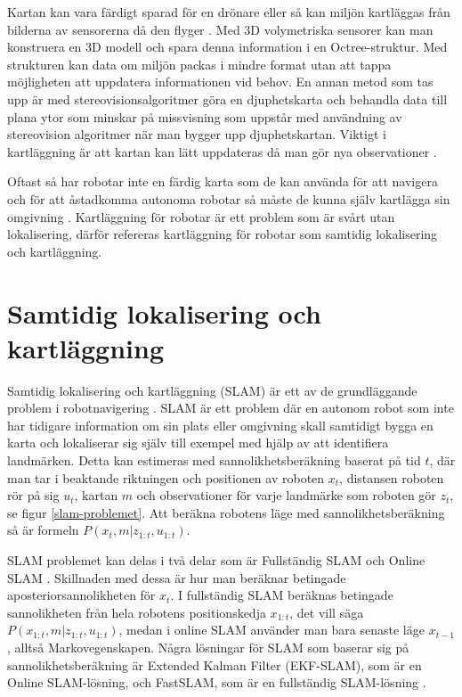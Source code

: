Kartan kan vara färdigt sparad för en drönare eller så kan miljön kartläggas från bilderna av sensorerna då den flyger \citep{geospatial}. Med 3D volymetriska sensorer kan man konstruera en 3D modell och spara denna information i en Octree-struktur. Med strukturen kan data om miljön packas i mindre format utan att tappa möjligheten att uppdatera informationen vid behov. En annan metod som tas upp är med stereovisionsalgoritmer göra en djuphetskarta och behandla data till plana ytor som minskar på missvisning som uppstår med användning av stereovision algoritmer när man bygger upp djuphetskartan. Viktigt i kartläggning är att kartan kan lätt uppdateras då man gör nya observationer \citep{globalsubmaps}.

Oftast så har robotar inte en färdig karta som de kan använda för att navigera och för att åstadkomma autonoma robotar så måste de kunna själv kartlägga sin omgivning \citep{ProbabilisticRobotics}. Kartläggning för robotar är ett problem som är svårt utan lokalisering, därför refereras kartläggning för robotar som samtidig lokalisering och kartläggning. 

\chapter{Samtidig lokalisering och kartläggning}

Samtidig lokalisering och kartläggning (SLAM) är ett av de grundläggande problem i robotnavigering \citep{realslamproblem}. SLAM är ett problem där en autonom robot som inte har tidigare information om sin plats eller omgivning skall samtidigt bygga en karta och lokaliserar sig själv till exempel med hjälp av att identifiera landmärken. Detta kan estimeras med sannolikhetsberäkning baserat på tid $t$, där man tar i beaktande riktningen och positionen av roboten $x_t$, distansen roboten rör på sig $u_t$, kartan $m$ och observationer för varje landmärke som roboten gör $z_t$, se figur \ref{slam-problemet}. Att beräkna robotens läge med sannolikhetsberäkning så är formeln $P(x_t, m|z_{1:t}, u_{1:t})$. 

SLAM problemet kan delas i två delar som är Fullständig SLAM och Online SLAM \citep{ProbabilisticRobotics}. Skillnaden med dessa är hur man beräknar betingade aposteriorsannolikheten för $x_t$. I fullständig SLAM beräknas betingade sannolikheten från hela robotens positionskedja $x_{1:t}$, det vill säga $P(x_{1:t}, m | z_{1:t}, u_{1:t})$, medan i online SLAM använder man bara senaste läge $x_{t-1}$, alltså Markovegenskapen. Några lösningar för SLAM som baserar sig på sannolikhetsberäkning är Extended Kalman Filter (EKF-SLAM), som är en Online SLAM-lösning, och FastSLAM, som är en fullständig SLAM-lösning \citep{realslamproblem, ProbabilisticRobotics}. 

